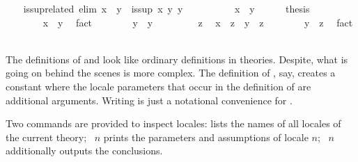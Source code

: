 \begin{isabellebody}
%
\endisatagproof
{\isafoldproof}%
%
\isadelimproof
\isanewline
%
\endisadelimproof
%
\isadeliminvisible
\isanewline
\ \ %
\endisadeliminvisible
%
\isataginvisible
{}\isamarkupfalse%
\ is{\isacharunderscore}sup{\isacharunderscore}related\ {\isacharbrackleft}elim{\isacharquery}{\isacharbrackright}{\isacharcolon}\ {\isachardoublequoteopen}x\ {\isasymsqsubseteq}\ y\ {\isasymLongrightarrow}\ is{\isacharunderscore}sup\ x\ y\ y{\isachardoublequoteclose}\isanewline
\ \ \isamarkupfalse%
\ {\isacharminus}\isanewline
\ \ \ \ \isamarkupfalse%
\ {\isachardoublequoteopen}x\ {\isasymsqsubseteq}\ y{\isachardoublequoteclose}\isanewline
\ \ \ \ \isamarkupfalse%
\ {\isacharquery}thesis\isanewline
\ \ \ \ \isamarkupfalse%
\isanewline
\ \ \ \ \ \ \isamarkupfalse%
\ {\isachardoublequoteopen}x\ {\isasymsqsubseteq}\ y{\isachardoublequoteclose}\ \isamarkupfalse%
\ fact\isanewline
\ \ \ \ \ \ \isamarkupfalse%
\ {\isachardoublequoteopen}y\ {\isasymsqsubseteq}\ y{\isachardoublequoteclose}\ \isacommand{{\isachardot}{\isachardot}}\isamarkupfalse%
\isanewline
\ \ \ \ \ \ \isamarkupfalse%
\ z\ \isamarkupfalse%
\ {\isachardoublequoteopen}x\ {\isasymsqsubseteq}\ z{\isachardoublequoteclose}\ \ {\isachardoublequoteopen}y\ {\isasymsqsubseteq}\ z{\isachardoublequoteclose}\isanewline
\ \ \ \ \ \ \isamarkupfalse%
\ {\isachardoublequoteopen}y\ {\isasymsqsubseteq}\ z{\isachardoublequoteclose}\ \isamarkupfalse%
\ fact\isanewline
\ \ \ \ \isamarkupfalse%
\isanewline
\ \ \isamarkupfalse%
%
\endisataginvisible
{\isafoldinvisible}%
%
\isadeliminvisible
\isanewline
%
\endisadeliminvisible
\isanewline
\ \ \isamarkupfalse%
%
\begin{isamarkuptext}%
The definitions of  and  look
  like ordinary definitions in theories.  Despite, what is going on
  behind the scenes is more complex.  The definition of , say, creates a constant  where
  the locale parameters that occur in the definition of 
  are additional arguments.  Writing  is just
  a notational convenience for .%
\end{isamarkuptext}%
\isamarkuptrue%
%
\begin{isamarkuptext}%
Two commands are provided to inspect locales:
   lists the names of all locales of the
  current theory; ~$n$ prints the parameters
  and assumptions of locale $n$; ~$n$
  additionally outputs the conclusions.


\end{isamarkuptext}
\end{isabellebody}

